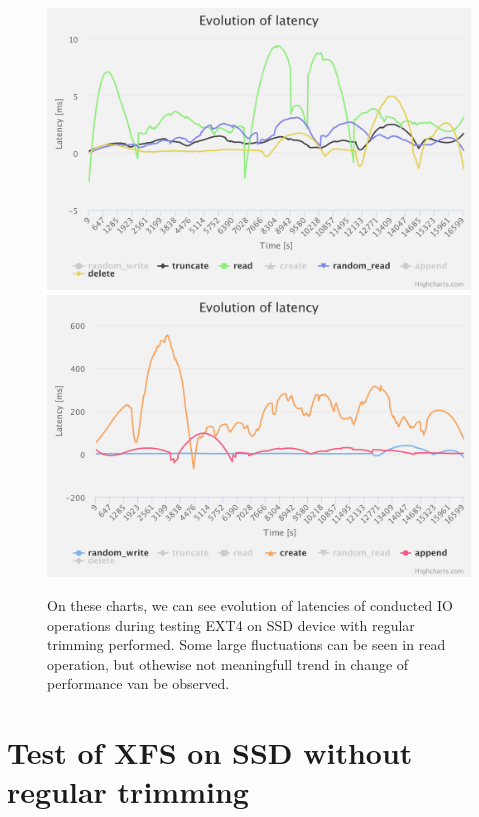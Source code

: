 \documentclass[
  color, %
  table, %
  lof,   %
  lot,   %
]{fithesis3}
\begin{document}
\begin{figure}[!htb]
    \centering
   \begin{minipage}{\textwidth}
        \centering
        \includegraphics[width=\textwidth]{../charts/SSD_ext4_trim/1}
        \includegraphics[width=\textwidth]{../charts/SSD_ext4_trim/2}
                \caption[Evolution of latencies of EXT4 during testing on SSD with regular trimming]{On these charts, we can see evolution of latencies of conducted IO operations during testing EXT4 on SSD device with regular trimming performed. Some large fluctuations can be seen in read operation, but othewise not meaningfull trend in change of performance van be observed.}
\label{fig:lats_ext4_ssd}
    \end{minipage}
\end{figure}

\clearpage


\section{Test of XFS on SSD without regular trimming}
\end{document}
